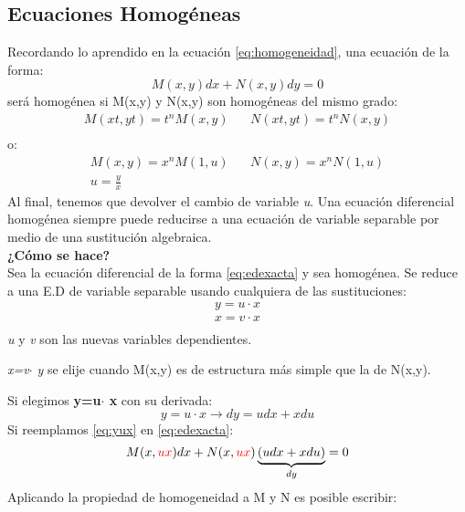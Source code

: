 \documentclass[
	11pt, %
	fleqn, %
	a4paper, %
]{LegrandOrangeBook}
\begin{document}
\subsection{Ecuaciones Homogéneas}
Recordando lo aprendido en la ecuación \ref{eq:homogeneidad}, una ecuación de la forma:
\begin{displaymath}
M(x,y)dx+N(x,y)dy=0
\end{displaymath}
será homogénea si M(x,y) y N(x,y) son homogéneas del mismo grado:
\begin{align*}
M(xt,yt)=t^nM(x,y) \hspace{20pt} N(xt,yt)=t^nN(x,y)\\
\end{align*}
o:
\begin{align*}
M(x,y)=x^nM(1,u) \hspace{20pt} N(x,y)=x^nN(1,u)\\
u=\frac{y}{x}
\end{align*}
Al final, tenemos que devolver el cambio de variable \textit{u}. Una ecuación diferencial homogénea siempre puede reducirse a una ecuación de variable separable por medio de una sustitución algebraica.\\
\textbf{¿Cómo se hace?}\\
Sea la ecuación diferencial de la forma \ref{eq:edexacta} y sea homogénea. Se reduce a una E.D de variable separable usando cualquiera de las sustituciones:
\begin{subequations}
\begin{align}
y=u\cdot x
\label{eq:edhsustituciony} \\
x=v\cdot x
\label{eq:edhsustitucionx} \\
\end{align}
\end{subequations}
\textit{u} y \textit{v} son las nuevas variables dependientes.
\begin{remark}
\textit{x=v$\cdot$ y} se elije cuando M(x,y) es de estructura más simple que la de N(x,y).
\end{remark}
Si elegimos \textbf{y=u$\cdot$ x} con su derivada:
\begin{equation}\label{eq:yux}
y=u\cdot x\longrightarrow dy=udx+xdu
\end{equation}
Si reemplamos \ref{eq:yux} en \ref{eq:edexacta}:
\begin{displaymath}
M(x,\textcolor{red}{ux})dx+N(x,\textcolor{red}{ux})\underbrace{(udx+xdu)}_{dy}=0
\end{displaymath}
Aplicando la propiedad de homogeneidad a M y N es posible escribir:
\end{document}
